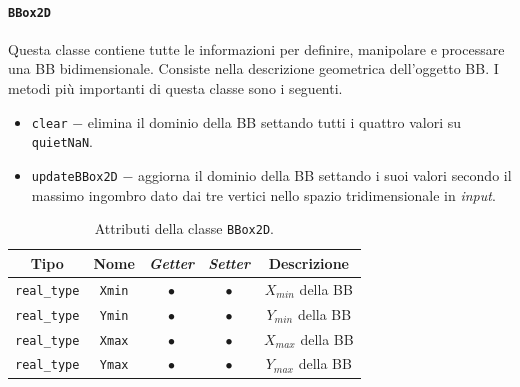 \paragraph{\texttt{BBox2D}}
Questa classe contiene tutte le informazioni per definire, manipolare e processare una \ac{BB} bidimensionale. Consiste nella descrizione geometrica dell'oggetto \ac{BB}. I metodi più importanti di questa classe sono i seguenti.
\begin{itemize}
	\item \texttt{clear} $-$ elimina il dominio della \ac{BB} settando tutti i quattro valori su \texttt{quietNaN}.
	\item \texttt{updateBBox2D} $-$ aggiorna il dominio della \ac{BB} settando i suoi valori secondo il massimo ingombro dato dai tre vertici nello spazio tridimensionale in \textit{input}.
\end{itemize}
\begin{table}[h!]
	\centering
	\begin{tabular}{|c|c|c|c|c|}
		\hline 
		\textbf{Tipo} & \textbf{Nome} & \textit{\textbf{Getter}} & \textit{\textbf{Setter}} & \textbf{Descrizione} \\ \hline 
		\texttt{real\_type} & \texttt{Xmin} & $\bullet$ & $\bullet$ & $X_{min}$ della \ac{BB} \\ \hline 
		\texttt{real\_type} & \texttt{Ymin} & $\bullet$ & $\bullet$ & $Y_{min}$ della \ac{BB} \\ \hline
		\texttt{real\_type} & \texttt{Xmax} & $\bullet$ & $\bullet$ & $X_{max}$ della \ac{BB} \\ \hline
		\texttt{real\_type} & \texttt{Ymax} & $\bullet$ & $\bullet$ & $Y_{max}$ della \ac{BB} \\ \hline
	\end{tabular}
	\caption{Attributi della classe \texttt{BBox2D}.}
	\label{BBox2D}
\end{table}
%
